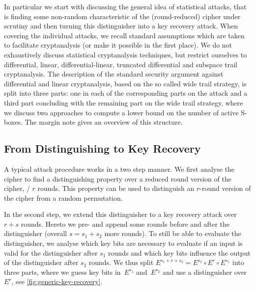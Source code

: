 In particular we start with discussing the general idea of statistical attacks, that is finding some non-random characteristic of the (round-reduced) cipher under scrutiny and then turning this distinguisher into a key recovery attack.
When covering the individual attacks, we recall standard assumptions which are taken to facilitate cryptanalysis (or make it possible in the first place).
We do not exhaustively discuss statistical cryptanalysis techniques, but restrict ourselves to differential, linear, differential-linear, truncated differential and subspace trail cryptanalysis.
The description of the standard security argument against differential and linear cryptanalysis, based on the so called wide trail strategy, is split into three parts: one in each of the corresponding parts on the attack and a third part concluding with the remaining part on the wide trail strategy, where we discuss two approaches to compute a lower bound on the number of active S-boxes.
The margin note gives an overview of this structure.

\subsection{From Distinguishing to Key Recovery}\label{sec:dist-to-keyrec}
A typical attack procedure works in a two step manner.
We first analyse the cipher to find a distinguishing property over a reduced round version of the cipher, \eg/ $r$ rounds.
This property can be used to distinguish an $r$-round version of the cipher from a random permutation.

In the second step, we extend this distinguisher to a key recovery attack over $r+s$ rounds.
Hereto we pre- and append some rounds before and after the distinguisher (overall $s = s_1 + s_2$ more rounds).
To still be able to evaluate the distinguisher, we analyse which key bits are necessary to evaluate if an input is valid for the distinguisher after $s_1$ rounds and which key bits influence the output of the distinguisher after $s_2$ rounds.
We thus split $E^{s_1 + r + s_2} = E^{s_2} \circ E^r \circ E^{s_1}$ into three parts, where we guess key bits in~$E^{s_1}$ and~$E^{s_2}$ and use a distinguisher over $E^r$, see \cref{fig:generic-key-recovery}.

